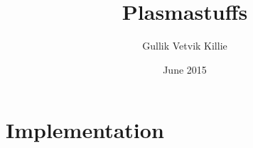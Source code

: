 \documentclass[x11names,twoside,english]{uiofysmaster}
\author{Gullik Vetvik Killie}
\title{Plasmastuffs}
\date{June 2015}
\begin{document}
% 
%
\tableofcontents
% 

%     

%     
%     
%     
%     
%     
%
%     
%     
%     
%     
%     

\chapter{Implementation}
    
    
    
    
%     
%     
%     
\end{document}
